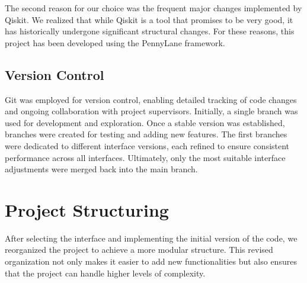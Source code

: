 The second reason for our choice was the frequent major changes implemented by Qiskit. We realized that while Qiskit is a tool that promises to be very good, it has historically undergone significant structural changes. For these reasons, this project has been developed using the PennyLane framework.

\subsection{Version Control}
Git was employed for version control, enabling detailed tracking of code changes and ongoing collaboration with project supervisors. Initially, a single branch was used for development and exploration. Once a stable version was established, branches were created for testing and adding new features. The first branches were dedicated to different interface versions, each refined to ensure consistent performance across all interfaces. Ultimately, only the most suitable interface adjustments were merged back into the main branch.

\section{Project Structuring}

After selecting the interface and implementing the initial version of the code, we reorganized the project to achieve a more modular structure. This revised organization not only makes it easier to add new functionalities but also ensures that the project can handle higher levels of complexity.

